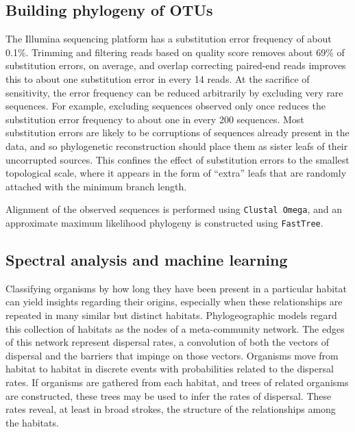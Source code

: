 \subsection{Building phylogeny of OTUs}

The Illumina sequencing platform has a substitution error frequency of about 0.1\%. \cite{ross2013characterizing} Trimming and filtering reads based on quality score removes about 69\% of substitution errors, on average, \cite{schirmer2016illumina} and overlap correcting paired-end reads improves this to about one substitution error in every 14 reads. \cite{bolger2014trimmomatic} At the sacrifice of sensitivity, the error frequency can be reduced arbitrarily by excluding very rare sequences. For example, excluding sequences observed only once reduces the substitution error frequency to about one in every 200 sequences. Most substitution errors are likely to be corruptions of sequences already present in the data, and so phylogenetic reconstruction should place them as sister leafs of their uncorrupted sources. This confines the effect of substitution errors to the smallest topological scale, where it appears in the form of ``extra'' leafs that are randomly attached with the minimum branch length.

Alignment of the observed sequences is performed using {\tt Clustal Omega}, \cite{goujon2010new, sievers2011fast} and an approximate maximum likelihood phylogeny is constructed using {\tt FastTree}. \cite{price2009fasttree, price2010fasttree}




\subsection{Spectral analysis and machine learning}

Classifying organisms by how long they have been present in a particular habitat can yield insights regarding their origins, especially when these relationships are repeated in many similar but distinct habitats. Phylogeographic models regard this collection of habitats as the nodes of a meta-community network. The edges of this network represent dispersal rates, a convolution of both the vectors of dispersal and the barriers that impinge on those vectors. Organisms move from habitat to habitat in discrete events with probabilities related to the dispersal rates. If organisms are gathered from each habitat, and trees of related organisms are constructed, these trees may be used to infer the rates of dispersal. These rates reveal, at least in broad strokes, the structure of the relationships among the habitats.


